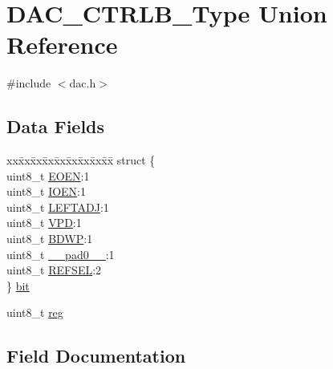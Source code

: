 \hypertarget{union_d_a_c___c_t_r_l_b___type}{}\section{D\+A\+C\+\_\+\+C\+T\+R\+L\+B\+\_\+\+Type Union Reference}
\label{union_d_a_c___c_t_r_l_b___type}


{\ttfamily \#include $<$dac.\+h$>$}

\subsection*{Data Fields}
\begin{DoxyCompactItemize}
\item 
\begin{tabbing}
xx\=xx\=xx\=xx\=xx\=xx\=xx\=xx\=xx\=\kill
struct \{\\
\>uint8\_t \mbox{\hyperlink{union_d_a_c___c_t_r_l_b___type_a96f714232ff7f0675cd21de211d88968}{EOEN}}:1\\
\>uint8\_t \mbox{\hyperlink{union_d_a_c___c_t_r_l_b___type_a0c6f7fb6bd241f875e377431ef6b7775}{IOEN}}:1\\
\>uint8\_t \mbox{\hyperlink{union_d_a_c___c_t_r_l_b___type_a7ed2886f45e112aefa4cef7a8b2bb472}{LEFTADJ}}:1\\
\>uint8\_t \mbox{\hyperlink{union_d_a_c___c_t_r_l_b___type_a8a5093ce0813524f115596f28e7ca694}{VPD}}:1\\
\>uint8\_t \mbox{\hyperlink{union_d_a_c___c_t_r_l_b___type_ac116f5987aa66800aa8fb8907eb50ff0}{BDWP}}:1\\
\>uint8\_t \mbox{\hyperlink{union_d_a_c___c_t_r_l_b___type_a8b4eebe79ded0459acec2f4950102ba3}{\_\_pad0\_\_}}:1\\
\>uint8\_t \mbox{\hyperlink{union_d_a_c___c_t_r_l_b___type_a31386ac97a08a22e5f39b0481794d58a}{REFSEL}}:2\\
\} \mbox{\hyperlink{union_d_a_c___c_t_r_l_b___type_a0fe4606727549123804036568f23b947}{bit}}\\

\end{tabbing}\item 
uint8\+\_\+t \mbox{\hyperlink{union_d_a_c___c_t_r_l_b___type_a9428adc9af4653a2050e2536b55dec8d}{reg}}
\end{DoxyCompactItemize}


\subsection{Field Documentation}
\mbox{\label{union_d_a_c___c_t_r_l_b___type_a8b4eebe79ded0459acec2f4950102ba3}} 
